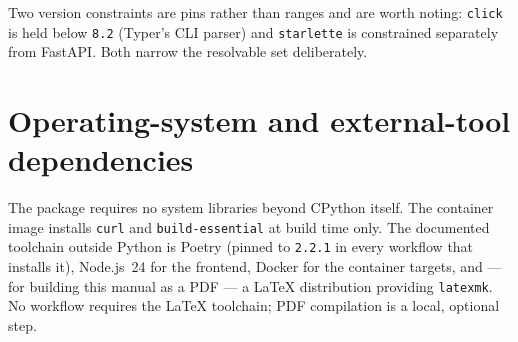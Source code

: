 Two version constraints are pins rather than ranges and are worth noting:
\texttt{click} is held below \texttt{8.2} (Typer's CLI parser) and
\texttt{starlette} is constrained separately from FastAPI. Both narrow the
resolvable set deliberately.

\section{Operating-system and external-tool dependencies}

The package requires no system libraries beyond CPython itself. The container
image installs \texttt{curl} and \texttt{build-essential} at build time only.
The documented toolchain outside Python is Poetry (pinned to \texttt{2.2.1} in
every workflow that installs it), Node.js~24 for the frontend, Docker for the
container targets, and --- for building this manual as a PDF --- a LaTeX
distribution providing \texttt{latexmk}. No workflow requires the LaTeX
toolchain; PDF compilation is a local, optional step.


